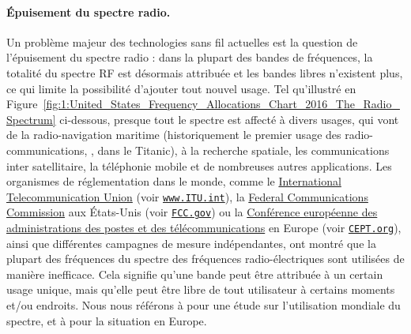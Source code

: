 \begin{resume_fr}
\paragraph{Épuisement du spectre radio.}
%
Un problème majeur des technologies sans fil actuelles est la question de l'épuisement du spectre radio :
dans la plupart des bandes de fréquences, la totalité du spectre RF est désormais attribuée et les bandes libres n'existent plus, ce qui limite la possibilité d'ajouter tout nouvel usage.
Tel qu'illustré en Figure~\ref{fig:1:United_States_Frequency_Allocations_Chart_2016_The_Radio_Spectrum} ci-dessous,
presque tout le spectre
est affecté à divers usages, qui vont de la radio-navigation maritime (historiquement le premier usage des radio-communications, \eg, dans le Titanic), à la recherche spatiale, les communications inter satellitaire, la téléphonie mobile et de nombreuses autres applications.
%
Les organismes de réglementation dans le monde, comme le
\href{https://www.itu.int/en/Pages/default.aspx}{International Telecommunication Union} (voir \href{https://www.itu.int/}{\texttt{www.ITU.int}}),
la \href{https://www.fcc.gov/}{Federal Communications Commission} aux États-Unis (voir \href{https://www.fcc.gov/}{\texttt{FCC.gov}})
ou la \href{https://cept.org}{ Conférence européenne des administrations des postes et des télécommunications} en Europe (voir \href{https://www.CEPT.org/}{\texttt{CEPT.org}}),
ainsi que différentes campagnes de mesure indépendantes, ont montré que la plupart des fréquences du spectre des fréquences radio-électriques sont utilisées de manière inefficace.
Cela signifie qu'une bande peut être attribuée à un certain usage unique, mais qu'elle peut être libre de tout utilisateur à certains moments et/ou endroits.
Nous nous référons à \cite{patil2011survey} pour une étude sur l'utilisation mondiale du spectre, et à \cite{valenta2010survey} pour la situation en Europe.



\end{resume_fr}
